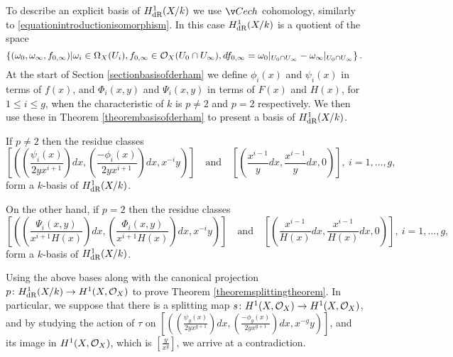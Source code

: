To describe an explicit basis of $H_{\text {dR}}^1(X/k)$ we use $\cech$ cohomology, similarly to \eqref{equationintroductionisomorphism}.
In this case $H_{\text {dR}}^1(X/k)$ is a quotient of the space 
    \begin{equation*}
    \left\{(\omega_0, \omega_\infty, f_{0,\infty}) | \omega_i\in \Omega_X(U_i), f_{0,\infty}\in {\cal O}_X(U_0 \cap U_\infty), df_{0,\infty} = \omega_0|_{U_0\cap U_\infty} - \omega_\infty|_{U_0\cap U_\infty} \right\}.
    \end{equation*}
At the start of Section \ref{sectionbasisofderham} we define $\phi_i(x)$ and $\psi_i(x)$ in terms of $f(x)$, and $\Phi_i(x,y)$ and $\Psi_i(x,y)$ in terms of $F(x)$ and $H(x)$, for $1 \leq i \leq g$, when the characteristic of $k$ is $p \neq 2$ and $p = 2$ respectively.
We then use these in Theorem \ref{theorembasisofderham} to present a basis of $H_{\text {dR}}^1(X/k)$.
    
    \begin{unnumthm}\label{theorembasisofderham}
    If $p \neq 2$ then the residue classes 
        \begin{equation*}
         \left[ \left( \left( \frac{\psi_i(x)}{2yx^{i+1}}\right) dx, \left(\frac{-\phi_i(x)}{2yx^{i+1}}\right) dx, x^{-i}y \right)\right] 
    \quad \text{and} \quad
         \left[ \left( \frac{x^{i-1}}{y} dx , \frac{x^{i-1}}{y} dx, 0 \right)\right] ,\ i = 1,\ldots ,g,
        \end{equation*}
    form a $k$-basis of $H_{\text {dR}}^1(X/k)$.
    
    On the other hand, if $p=2$ then the residue classes 
        \begin{equation*}
        \left[ \left( \left(\frac{\Psi_i(x,y)}{x^{i+1}H(x)}\right) dx, \left( \frac{\Phi_i(x,y)}{x^{i+1}H(x)} \right) dx, x^{-i}y \right)\right] 
    \quad \text{and} \quad
        \left[ \left( \frac{x^{i-1}}{H(x)} dx, \frac{x^{i-1}}{H(x)} dx, 0 \right)\right],\ i=1, \ldots, g,
        \end{equation*}
    form a $k$-basis of $H_{\text {dR}}^1(X/k)$.
    \end{unnumthm}

Using the above bases along with the canonical projection $p\colon H_{\text {dR}}^1(X/k) \rightarrow H^1(X,\mathcal{O}_X)$ to prove Theorem \ref{theoremsplittingtheorem}.
In particular, we suppose that there is a splitting map $s \colon H^1(X,\mathcal{O}_X) \rightarrow H^1(X,\mathcal{O}_X)$, and by studying the action of $\tau$ on $\left[ \left( \left( \frac{\psi_g(x)}{2yx^{g+1}}\right) dx, \left(\frac{-\phi_g(x)}{2yx^{g+1}}\right) dx, x^{-g}y \right)\right]$, and its image in $H^1(X,\mathcal{O}_X)$, which is $\left[ \frac{y}{x^g} \right]$, we arrive at a contradiction.



